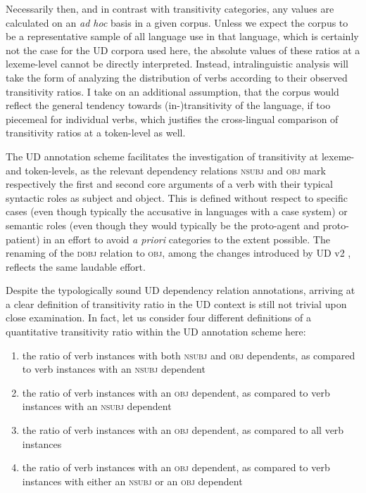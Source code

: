 Necessarily then, and in contrast with transitivity categories, any values are calculated on an \textit{ad hoc} basis in a given corpus. Unless we expect the corpus to be a representative sample of all language use in that language, which is certainly not the case for the UD corpora used here, the absolute values of these ratios at a lexeme-level cannot be directly interpreted. Instead, intralinguistic analysis will take the form of analyzing the distribution of verbs according to their observed transitivity ratios. I take on an additional assumption, that the corpus would reflect the general tendency towards (in-)transitivity of the language, if too piecemeal for individual verbs, which justifies the cross-lingual comparison of transitivity ratios at a token-level as well.

The UD annotation scheme facilitates the investigation of transitivity at lexeme- and token-levels, as the relevant dependency relations \textsc{nsubj} and \textsc{obj} mark respectively the first and second core arguments of a verb with their typical syntactic roles as subject and object. This is defined without respect to specific cases (even though typically the accusative in languages with a case system) or semantic roles (even though they would typically be the proto-agent and proto-patient) in an effort to avoid \textit{a priori} categories to the extent possible. The renaming of the \textsc{dobj} relation to \textsc{obj}, among the changes introduced by UD v2 \citep{nivre2020}, reflects the same laudable effort.

Despite the typologically sound UD dependency relation annotations, arriving at a clear definition of transitivity ratio in the UD context is still not trivial upon close examination. In fact, let us consider four different definitions of a quantitative transitivity ratio within the UD annotation scheme here:

\begin{enumerate}
    \item the ratio of verb instances with both \textsc{nsubj} and \textsc{obj} dependents, as compared to verb instances with an \textsc{nsubj} dependent
    \item the ratio of verb instances with an \textsc{obj} dependent, as compared to verb instances with an \textsc{nsubj} dependent
    \item the ratio of verb instances with an \textsc{obj} dependent, as compared to all verb instances
    \item the ratio of verb instances with an \textsc{obj} dependent, as compared to verb instances with either an \textsc{nsubj} or an \textsc{obj} dependent
\end{enumerate}

